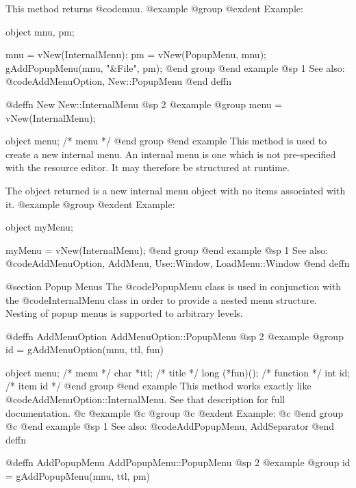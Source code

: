 This method returns @code{mnu}.
@example
@group
@exdent Example:

object  mnu, pm;

mnu = vNew(InternalMenu);
pm  = vNew(PopupMenu, mnu);
gAddPopupMenu(mnu, "&File", pm);
@end group
@end example
@sp 1
See also:  @code{AddMenuOption, New::PopupMenu}
@end deffn








@deffn {New} New::InternalMenu
@sp 2
@example
@group
menu = vNew(InternalMenu);

object  menu;   /*  menu     */
@end group
@end example
This method is used to create a new internal menu.  An internal menu is
one which is not pre-specified with the resource editor.  It may therefore
be structured at runtime.

The object returned is a new internal menu object with no items associated
with it.
@example
@group
@exdent Example:

object  myMenu;

myMenu = vNew(InternalMenu);
@end group
@end example
@sp 1
See also:  @code{AddMenuOption, AddMenu, Use::Window, LoadMenu::Window}
@end deffn





@section Popup Menus
The @code{PopupMenu} class is used in conjunction with the
@code{InternalMenu} class in order to provide a nested menu structure.
Nesting of popup menus is supported to arbitrary levels.








@deffn {AddMenuOption} AddMenuOption::PopupMenu
@sp 2
@example
@group
id = gAddMenuOption(mnu, ttl, fun)

object  menu;   /*  menu     */
char    *ttl;   /*  title    */
long    (*fun)(); /*  function  */
int     id;     /*  item id  */
@end group
@end example
This method works exactly like @code{AddMenuOption::InternalMenu}.
See that description for full documentation.
@c @example
@c @group
@c @exdent Example:
@c @end group
@c @end example
@sp 1
See also:  @code{AddPopupMenu, AddSeparator}
@end deffn









@deffn {AddPopupMenu} AddPopupMenu::PopupMenu
@sp 2
@example
@group
id = gAddPopupMenu(mnu, ttl, pm)

